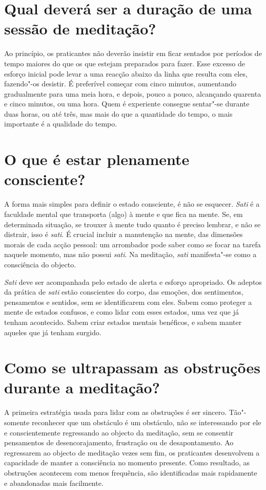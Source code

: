 \section{Qual deverá ser a duração de uma sessão de meditação?}

Ao princípio, os praticantes não deverão insistir em ficar sentados por
períodos de tempo maiores do que os que estejam preparados para fazer.
Esse excesso de esforço inicial pode levar a uma reacção abaixo da linha
que resulta com eles, fazendo"-os desistir. É preferível começar com
cinco minutos, aumentando gradualmente para uma meia hora, e depois,
pouco a pouco, alcançando quarenta e cinco minutos, ou uma hora. Quem é
experiente consegue sentar"-se durante duas horas, ou até três, mas mais
do que a quantidade do tempo, o mais importante é a qualidade do tempo.

\section{O que é estar plenamente consciente?}

A forma mais simples para definir o estado consciente, é não se
esquecer. \emph{Sati} é a faculdade mental que transporta (algo) à mente
e que fica na mente. Se, em determinada situação, se trouxer à mente
tudo quanto é preciso lembrar, e não se distrair, isso é \emph{sati}. É
crucial incluir a manutenção na mente, das dimensões morais de cada
acção pessoal: um arrombador pode saber como se focar na tarefa naquele
momento, mas não possui \emph{sati}. Na meditação, \emph{sati}
manifesta"-se como a consciência do objecto.

\emph{Sati} deve ser acompanhada pelo estado de alerta e esforço
apropriado. Os adeptos da prática de \emph{sati} estão conscientes do
corpo, das emoções, dos sentimentos, pensamentos e sentidos, sem se
identificarem com eles. Sabem como proteger a mente de estados confusos,
e como lidar com esses estados, uma vez que já tenham acontecido. Sabem
criar estados mentais benéficos, e sabem manter aqueles que já tenham
surgido.

\section{Como se ultrapassam as obstruções durante a meditação?}

A primeira estratégia usada para lidar com as obstruções é ser sincero.
Tão"-somente reconhecer que um obstáculo é um obstáculo, não se
interessando por ele e conscientemente regressando ao objecto da
meditação, sem se consentir pensamentos de desencorajamento, frustração
ou de desapontamento. Ao regressarem ao objecto de meditação vezes sem
fim, os praticantes desenvolvem a capacidade de manter a consciência no
momento presente. Como resultado, as obstruções acontecem com menos
frequência, são identificadas mais rapidamente e abandonadas mais
facilmente.

